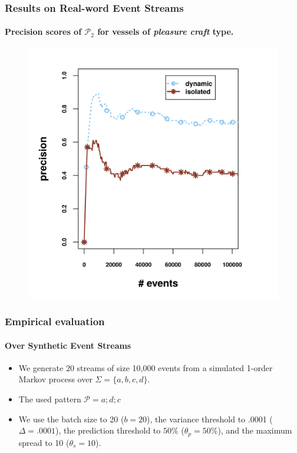 \begin{frame}
	
	\frametitle{Results on Real-word Event Streams }
	\framesubtitle{Precision scores of $\mathcal{P}_2$  for vessels of \textit{pleasure craft} type.}
	
\begin{figure}[]
	\centering
	\includegraphics[width=.9\textwidth,height=.8\textheight]{../chapters/figures/synopses/new/precision_p2.png}
	
\end{figure}
	
\end{frame}




\begin{frame}
	
	\frametitle{Empirical evaluation }
	\framesubtitle{Over Synthetic Event Streams}
	\begin{itemize}
		\item<1-> We generate $20$ streams of size 10,000 events from a simulated 1-order Markov process over $\Sigma=\{a, b, c, d\}$.
		
		\item<1->The used pattern $\mathcal{P}=a ; d ; c$
		
		\item<1-> We use the batch size to 20 ($b=20$), the variance threshold to .0001 ($\Delta=.0001$), the  \pmcmr prediction threshold to $50\%$ ($\theta_{p}=50\%$), and the maximum spread to 10 ($\theta_{s}=10$).
	\end{itemize}
	
\end{frame}


